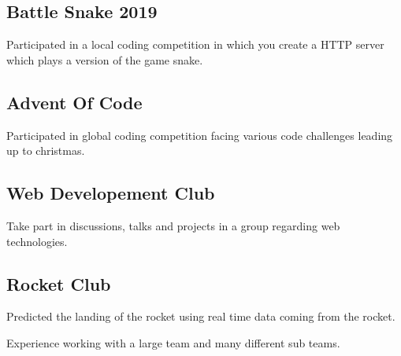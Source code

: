 \documentclass{article}
\newcommand{\hrefColored}[3]{\href{#2}{\color{#1}{#3}}}
\begin{document}
\subsection{Battle Snake 2019 \hrefColored{blue}{https://github.com/McRaeAlex/BattleSnake2019}{github.com/McRaeAlex/BattleSnake2019}}

Participated in a local coding competition in which you create a HTTP server
which plays a version of the game snake.

\subsection{Advent Of Code \hrefColored{blue}{https://github.com/McRaeAlex/AdventOfCode2018}{github.com/McRaeAlex/AdventOfCode2018}}

Participated in global coding competition facing various code challenges leading
up to christmas.

\subsection{Web Developement Club}

Take part in discussions, talks and projects in a group regarding web 
technologies.

\subsection{Rocket Club}

Predicted the landing of the rocket using real time data coming from the rocket.

Experience working with a large team and many different sub teams.
\end{document}
